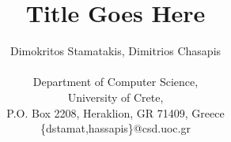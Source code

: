 \documentclass[11pt,twocolumn]{article}
\title{Title Goes Here}
\author{
Dimokritos Stamatakis, Dimitrios Chasapis \\ \\
Department of Computer Science, \\
University of Crete, \\
P.O. Box 2208, Heraklion, GR 71409, Greece \\
\{dstamat,hassapis\}@csd.uoc.gr
}
\begin{document}
\maketitle





%
%
%

{


}
\end{document}
